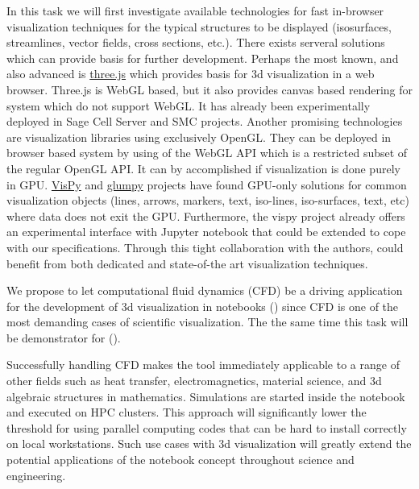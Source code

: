 \begin{workpackage}
\begin{tasklist}
\begin{task}[title=Visualization system for 3d data in web-notebook
,id=vis3d,lead=SR, partners={US,PS,USO}]
In this task we will first investigate available technologies for fast
in-browser visualization techniques for the typical structures to be
displayed (isosurfaces, streamlines, vector fields, cross sections,
etc.).  There exists serveral solutions which can provide basis for
further development. Perhaps the most known, and also advanced is
\href{http://threejs.org/}{three.js} which provides basis for 3d
visualization in a web browser. Three.js is WebGL based, but it also
provides canvas based rendering for system which do not support
WebGL. It has already been experimentally deployed in Sage Cell Server
and SMC projects. Another promising technologies are visualization
libraries using exclusively OpenGL. They can be deployed in browser based
system by using of the WebGL API which is a restricted subset of the
regular OpenGL API. It can by accomplished if visualization is done
purely in GPU. \href{http://vispy.org/}{VisPy} and
\href{http://glumpy.github.io/}{glumpy} projects have found GPU-only
solutions for common visualization objects (lines, arrows, markers,
text, iso-lines, iso-surfaces, text, etc) where data does not exit the
GPU. Furthermore, the vispy project already offers an experimental
interface with Jupyter notebook that could be extended to cope with
our specifications. Through this tight collaboration with the authors,
\TheProject could benefit from both dedicated and state-of-the art
visualization techniques.


\begin{task}[title=Visualization of 3d fluid dynamics data in web-notebook
,id=cfd-vis,lead=SR, partners={US,PS,USO}]

We propose to let computational fluid dynamics (CFD) be a driving
application for the development of 3d visualization in \Jupyter
notebooks () since CFD is one of the most demanding
cases of scientific visualization. The the same time this task will be
demonstrator for (). 

Successfully handling CFD makes the tool immediately applicable to a
range of other fields such as heat transfer, electromagnetics,
material science, and 3d algebraic structures in
mathematics. Simulations are started inside the notebook and executed
on HPC clusters. This approach will significantly lower the threshold
for using parallel computing codes that can be hard to install
correctly on local workstations. Such use cases with 3d visualization
will greatly extend the potential applications of the \Jupyter
notebook concept throughout science and engineering.


\end{task}
\end{task}
\end{tasklist}
\end{workpackage}
